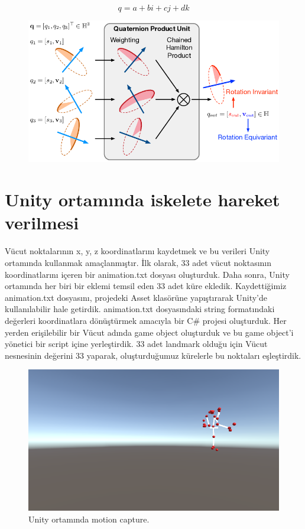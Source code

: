 \documentclass[12pt, a4paper]{article}
\begin{document}
\[
\boxed{q = a + bi + cj + dk}
\]
\begin{figure}[h]
	\centering
	\includegraphics[width=10 cm  ,height=5 cm  ]{quaternion-1.png}
\end{figure}
\section{Unity ortamında iskelete hareket verilmesi}
 Vücut noktalarının x, y, z koordinatlarını kaydetmek ve bu verileri Unity ortamında kullanmak amaçlanmıştır. İlk olarak, 33 adet vücut noktasının koordinatlarını içeren bir animation.txt dosyası oluşturduk. Daha sonra, Unity ortamında her biri bir eklemi temsil eden 33 adet küre ekledik. Kaydettiğimiz animation.txt dosyasını, projedeki Asset klasörüne yapıştırarak Unity'de kullanılabilir hale getirdik. animation.txt dosyasındaki string formatındaki değerleri koordinatlara dönüştürmek amacıyla bir C# projesi oluşturduk. Her yerden erişilebilir bir Vücut adında game object oluşturduk ve bu game object'i yönetici bir script içine yerleştirdik. 33 adet landmark olduğu için Vücut nesnesinin değerini 33 yaparak, oluşturduğumuz kürelerle bu noktaları eşleştirdik.
\begin{figure}[h]
	\centering
	\includegraphics[width=8 cm , height = 7 cm ]{3-1.png}
	\caption{Unity ortamında motion capture.}
\end{figure}
 
\end{document}
